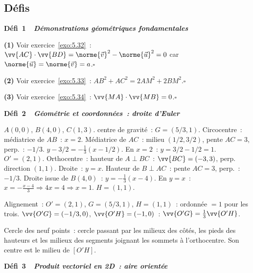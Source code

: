 \subsection*{D\'efis}

\noindent{}
{\color{BO}\bfseries\small D\'efi~1~\textendash\ \textit{D\'emonstrations g\'eom\'etriques fondamentales}}
\par\smallskip

\textbf{(1)} Voir exercice~\ref{exo:5.32}~: $\vv{AC}\cdot\vv{BD}=\norme{\vec{v}}^2-\norme{\vec{u}}^2=0$ car $\norme{\vec{u}}=\norme{\vec{v}}=a$.\hfill$\square$

\textbf{(2)} Voir exercice~\ref{exo:5.33}~: $AB^2+AC^2=2AM^2+2BM^2$.\hfill$\square$

\textbf{(3)} Voir exercice~\ref{exo:5.34}~: $\vv{MA}\cdot\vv{MB}=0$.\hfill$\square$

\noindent{}
{\color{BO}\bfseries\small D\'efi~2~\textendash\ \textit{G\'eom\'etrie et coordonn\'ees~: droite d'Euler}}
\par\smallskip

$A(0,0)$, $B(4,0)$, $C(1,3)$.
centre de gravité~: $G=(5/3,1)$.
Circocentre~: m\'ediatrice de $AB$~: $x=2$.
M\'ediatrice de $AC$~: milieu $(1/2,3/2)$, pente $AC=3$, perp.~: $-1/3$.
$y-3/2=-\frac{1}{3}(x-1/2)$. En $x=2$~: $y=3/2-1/2=1$. $O'=(2,1)$.
Orthocentre~: hauteur de $A\perp BC$~: $\vv{BC}=(-3,3)$, perp. direction $(1,1)$.
Droite~: $y=x$. Hauteur de $B\perp AC$~: pente $AC=3$, perp.~: $-1/3$.
Droite issue de $B(4,0)$~: $y=-\frac{1}{3}(x-4)$. En $y=x$~: $x=-\frac{x-4}{3}\Rightarrow4x=4\Rightarrow x=1$.
$H=(1,1)$.

Alignement~: $O'=(2,1)$, $G=(5/3,1)$, $H=(1,1)$~: ordonnée $=1$ pour les trois.\checkmark
$\vv{O'G}=(-1/3,0)$, $\vv{O'H}=(-1,0)$~: $\vv{O'G}=\frac{1}{3}\vv{O'H}$.\checkmark

Cercle des neuf points~: cercle passant par les milieux des c\^ot\'es, les pieds des hauteurs et les milieux des segments joignant les sommets \`a l'orthocentre. Son centre est le milieu de $[O'H]$.

\noindent{}
{\color{BO}\bfseries\small D\'efi~3~\textendash\ \textit{Produit vectoriel en 2D~: aire orient\'ee}}
\par\smallskip

